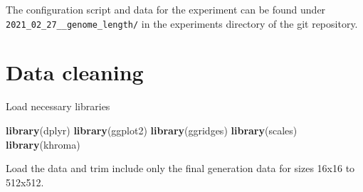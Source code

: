 \documentclass[
]{book}
\newenvironment{Shaded}{\begin{snugshade}}{\end{snugshade}}
\newcommand{\KeywordTok}[1]{\textcolor[rgb]{0.13,0.29,0.53}{\textbf{#1}}}
\newcommand{\NormalTok}[1]{#1}
\begin{document}
The configuration script and data for the experiment can be found under \texttt{2021\_02\_27\_\_genome\_length/} in the experiments directory of the git repository.

\hypertarget{data-cleaning-5}{%
\section{Data cleaning}\label{data-cleaning-5}}

Load necessary libraries

\begin{Shaded}
\begin{Highlighting}[]
\KeywordTok{library}\NormalTok{(dplyr)}
\KeywordTok{library}\NormalTok{(ggplot2)}
\KeywordTok{library}\NormalTok{(ggridges)}
\KeywordTok{library}\NormalTok{(scales)}
\KeywordTok{library}\NormalTok{(khroma)}
\end{Highlighting}
\end{Shaded}

Load the data and trim include only the final generation data for sizes 16x16 to 512x512.
\end{document}
